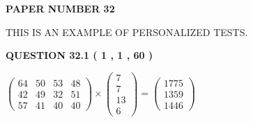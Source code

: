 \documentclass[12pt]{article}
\begin{document}
   
   
   
\newpage 
\setcounter{page}{ 
    32001 } 
   
   
   
   
 {\textbf{ \Large{ PAPER NUMBER           32  }}}
   
   
\vspace{0.2in}
   
   
   
   
   
   
 \vspace{0.2in}
{\Huge  THIS IS AN EXAMPLE OF}
{\Huge  PERSONALIZED TESTS. }
   
   
  
\vspace{0.2in}
  
{\textbf{\Large{QUESTION
32.1 
 (           1 ,           1 ,          60 )
}}}
  
  
 
 
\noindent{}

 
$\left( \begin{array}{ccccccccccccccc}
          64  & 
          50  & 
          53  & 
          48  \\ 
          42  & 
          49  & 
          32  & 
          51  \\ 
          57  & 
          41  & 
          40  & 
          40
\end{array}\right) \times
\left( \begin{array}{c}
           7  \\ 
           7  \\ 
          13  \\ 
           6
\end{array}\right)  =
\left( \begin{array}{c}
        1775  \\ 
        1359  \\ 
        1446
\end{array}\right)  $
 
\end{document}
